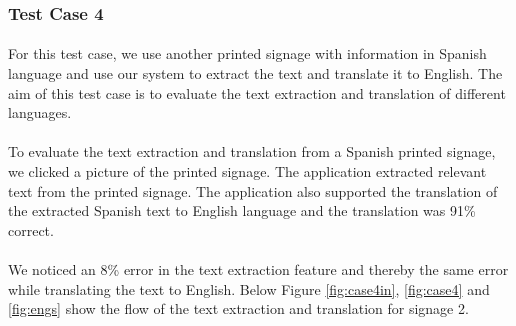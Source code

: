 \documentclass[12pt]{article}
\begin{document}
\subsubsection{Test Case 4}
\label{threefour}
\paragraph{}For this test case, we use another printed signage with information in Spanish language and use our system to extract the text and translate it to English. The aim of this test case is to evaluate the text extraction and translation of different languages. 

\paragraph{}To evaluate the text extraction and translation from a Spanish printed signage, we clicked a picture of the printed signage. The application extracted relevant text from the printed signage. The application also supported the translation of the extracted Spanish text to English language and the translation was 91\% correct.

\paragraph{}We noticed an 8\% error in the text extraction feature and thereby the same error while translating the text to English. Below Figure \ref{fig:case4in}, \ref{fig:case4} and \ref{fig:engs} show the flow of the text extraction and translation for signage 2.
\end{document}
